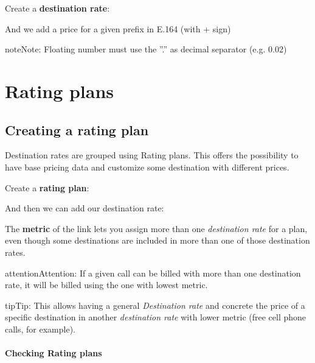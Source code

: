 \documentclass[letterpaper,10pt,english]{sphinxmanual}
\begin{document}
Create a \textbf{destination rate}:

\noindent{}

And we add a price for a given prefix in E.164 (with + sign)

\noindent{}

\begin{notice}{note}{Note:}
Floating number must use the ''.'' as decimal separator (e.g. 0.02)
\end{notice}


\section{Rating plans}
\label{brand/billing/rating_plans:rating-plans}\label{brand/billing/rating_plans::doc}

\subsection{Creating a rating plan}
\label{brand/billing/rating_plans:creating-a-rating-plan}
Destination rates are grouped using Rating plans. This offers the possibility to have base pricing data and customize
some destination with different prices.

Create a \textbf{rating plan}:

\noindent{}

And then we can add our destination rate:

\noindent{}

The \textbf{metric} of the link lets you assign more than one \emph{destination rate} for a
plan, even though some destinations are included in more than one of those
destination rates.

\begin{notice}{attention}{Attention:}
If a given call can be billed with more than one destination rate,
it will be billed using the one with lowest metric.
\end{notice}

\begin{notice}{tip}{Tip:}
This allows having a general \emph{Destination rate} and concrete the price of
a specific destination in another \emph{destination rate} with lower metric (free cell
phone calls, for example).
\end{notice}
\paragraph{Checking Rating plans}
\end{document}
